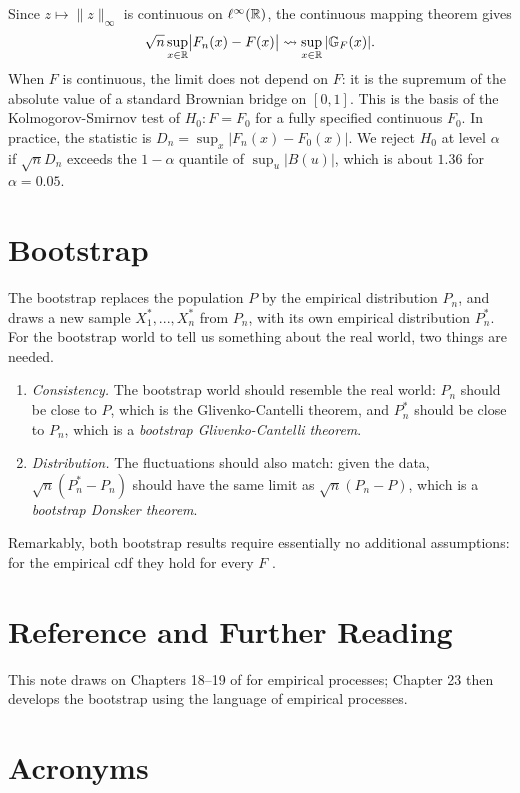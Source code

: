 \documentclass[a4paper,12pt]{article}
\begin{document}
\begin{example}\label{ex-ks}
	Since $z\mapsto\|z\|_\infty$ is continuous on $\ell^\infty(\mathbb{R})$, the continuous mapping theorem gives
	\begin{align}
		\sqrt n\sup_{x\in\mathbb{R}}\bigl|F_n(x)-F(x)\bigr|\overset{}{\leadsto}\sup_{x\in\mathbb{R}}|\mathbb G_F(x)|.
	\end{align}
	When $F$ is continuous, the limit does not depend on $F$:
	it is the supremum of the absolute value of a standard Brownian bridge on $[0,1]$.
	This is the basis of the Kolmogorov-Smirnov test of $H_0:F=F_0$ for a fully specified continuous $F_0$.
	In practice, the statistic is $D_n=\sup_x|F_n(x)-F_0(x)|$.
	We reject $H_0$ at level $\alpha$ if $\sqrt nD_n$ exceeds the $1-\alpha$ quantile of $\sup_u|B(u)|$,
	which is about $1.36$ for $\alpha=0.05$.
\end{example}

\section{Bootstrap}

The bootstrap replaces the population $P$ by the empirical distribution $P_n$,
and draws a new sample $X_1^*,...,X_n^*$ from $P_n$, with its own empirical distribution $P_n^*$.
For the bootstrap world to tell us something about the real world, two things are needed.
\begin{enumerate}
	\item
		\emph{Consistency.}
		The bootstrap world should resemble the real world:
		$P_n$ should be close to $P$, which is the Glivenko-Cantelli theorem,
		and $P_n^*$ should be close to $P_n$, which is a \emph{bootstrap Glivenko-Cantelli theorem}.
	\item
		\emph{Distribution.}
		The fluctuations should also match:
		given the data, $\sqrt n(P_n^*-P_n)$ should have the same limit as $\sqrt n(P_n-P)$,
		which is a \emph{bootstrap Donsker theorem}.
\end{enumerate}
Remarkably, both bootstrap results require essentially no additional assumptions:
for the empirical \gls{cdf} they hold for every $F$ \parencite[Theorem 23.7]{van-der-vaart-1998}.

\section*{Reference and Further Reading}

\printbibliography[heading=none]

\noindent
This note draws on Chapters 18--19 of \textcite{van-der-vaart-1998} for empirical processes;
Chapter 23 then develops the bootstrap using the language of empirical processes.

\vfill
\section*{Acronyms}
\printglossaries
\end{document}
